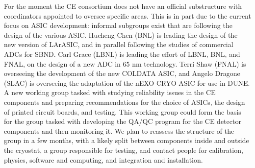 For the moment the CE consortium does not have an official substructure
with coordinators appointed to oversee specific areas. This is in part due
to the current focus on ASIC development: informal subgroups exist that
are following the design of the various ASIC. Hucheng Chen (BNL) is leading the
design of the new version of LArASIC, and in parallel following the studies
of commercial ADCs for SBND. Carl Grace (LBNL) is leading the effort of
LBNL, BNL, and FNAL, on the design of a new ADC in 65 nm technology. Terri
Shaw (FNAL) is overseeing the development of the new COLDATA ASIC, and
Angelo Dragone (SLAC) is overseeing the adaptation of the nEXO CRYO ASIC
for use in DUNE. A new working group tasked with studying reliability
issues in the CE components and preparing recommendations for the choice
of ASICs, the design of printed circuit boards, and testing. This working
group could form the basis for the group tasked with developing the QA/QC
program for the CE detector components and then monitoring it. We plan to
reassess the structure of the group in a few months, with a likely split
between components inside and outside the cryostat, a group responsible
for testing, and contact people for calibration, physics, software and
computing, and integration and installation.

